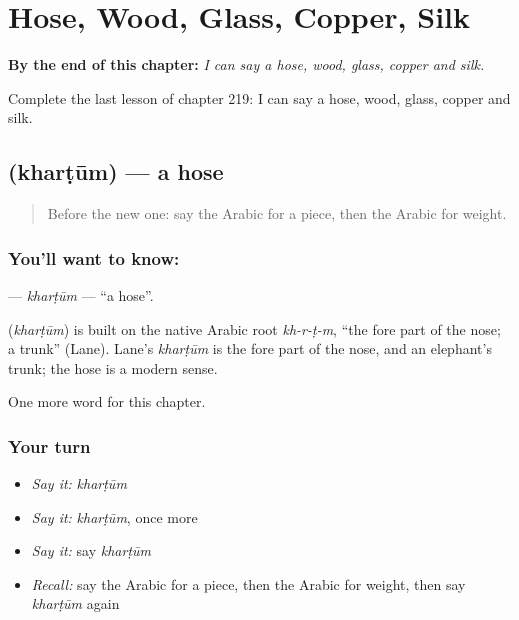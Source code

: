 
\chapter{Hose, Wood, Glass, Copper, Silk}
\label{ch:ar-hose-wood-glass-copper-silk}

\begin{chapteropening}
\textbf{By the end of this chapter:} \emph{I can say a hose, wood, glass, copper and silk.}

Complete the last lesson of chapter 219: I can say a hose, wood, glass, copper and silk.
\end{chapteropening}

\section[\texorpdfstring{\ar{خرطوم} (kharṭūm)}{خرطوم (kharṭūm)}]{ (kharṭūm) — a hose}

\label{lesson:AR-C219-khartum}



\begin{quote}
Before the new one: say the Arabic for a piece, then the Arabic for weight.
\end{quote}

\subsection*{You'll want to know: }
\textbf{} — \emph{kharṭūm} — \textquotedblleft{}a hose\textquotedblright{}.

\begin{cousinweb}
\textbf{} (\emph{kharṭūm}) is built on the native Arabic root \emph{kh-r-ṭ-m}, \textquotedblleft{}the fore part of the nose; a trunk\textquotedblright{} (Lane). Lane's \emph{kharṭūm} is the fore part of the nose, and an elephant's trunk; the hose is a modern sense.
\end{cousinweb}

\begin{grammarlens}[title={What you've built}]
One more word for this chapter.
\end{grammarlens}

\subsection*{Your turn}
\begin{itemize}
\raggedright
  \item \emph{Say it:} \emph{kharṭūm}
  \item \emph{Say it:} \emph{kharṭūm}, once more
  \item \emph{Say it:} say \emph{kharṭūm}
  \item \emph{Recall:} say the Arabic for a piece, then the Arabic for weight, then say \emph{kharṭūm} again
\end{itemize}

